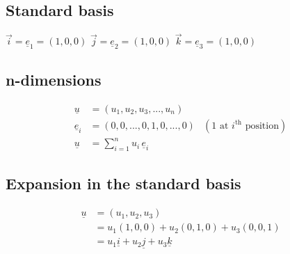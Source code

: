 \documentclass[11pt]{article}
\begin{document}
\subsection{Standard basis}
$\vec{i} = \underline{e}_1 = (1, 0, 0)$
$\vec{j} = \underline{e}_2 = (1, 0, 0)$
$\vec{k} = \underline{e}_3 = (1, 0, 0)$

\subsection{n-dimensions}
\begin{align*}
\underline{u} &= (u_1, u_2, u_3, ..., u_n) \\
\underline{e}_i &= (0, 0, ..., 0, 1, 0, ..., 0) & (\text{1 at } i^{\text{th}} \text{ position}) \\
\underline{u} &= \sum_{i=1}^n u_i\,\underline{e}_i
\end{align*}

\subsection{Expansion in the standard basis}
\begin{align*}
\underline{u} &= (u_1, u_2, u_3) \\
&= u_1(1, 0, 0) + u_2(0, 1, 0) + u_3(0, 0, 1) \\
&= u_1 \underline{i} + u_2\underline{j} + u_3\underline{k} \\
\end{align*}
\end{document}
